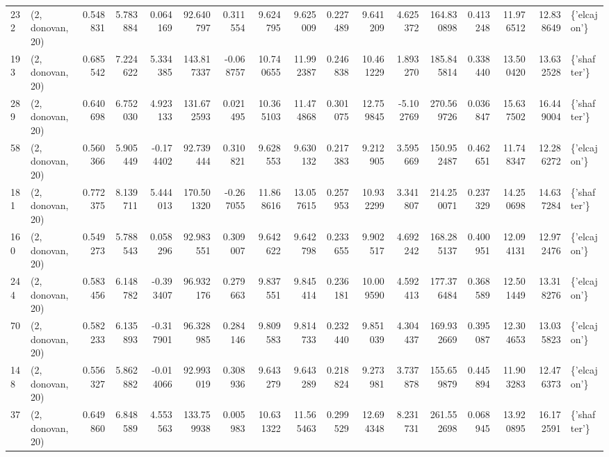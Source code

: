 \begin{tabular}{llrrrrrrrrrrrrrrl}
232 &  (2, donovan, 20) &   0.548831 &   5.783884 &   0.064169 &    92.640797 &   0.311554 &   9.624795 &   9.625009 &  0.227489 &   9.641209 &   4.625372 &   164.830898 &   0.413248 &  11.976512 &  12.838649 &  \{'elcajon'\} \\
193 &  (2, donovan, 20) &   0.685542 &   7.224622 &   5.334385 &   143.817337 &  -0.068757 &  10.740655 &  11.992387 &  0.246838 &  10.461229 &   1.893270 &   185.845814 &   0.338440 &  13.500420 &  13.632528 &  \{'shafter'\} \\
289 &  (2, donovan, 20) &   0.640698 &   6.752030 &   4.923133 &   131.672593 &   0.021495 &  10.365103 &  11.474868 &  0.301075 &  12.759845 &  -5.102769 &   270.569726 &   0.036847 &  15.637502 &  16.449004 &  \{'shafter'\} \\
58  &  (2, donovan, 20) &   0.560366 &   5.905449 &  -0.174402 &    92.739444 &   0.310821 &   9.628553 &   9.630132 &  0.217383 &   9.212905 &   3.595669 &   150.952487 &   0.462651 &  11.748347 &  12.286272 &  \{'elcajon'\} \\
181 &  (2, donovan, 20) &   0.772375 &   8.139711 &   5.444013 &   170.501320 &  -0.267055 &  11.868616 &  13.057615 &  0.257953 &  10.932299 &   3.341807 &   214.250071 &   0.237329 &  14.250698 &  14.637284 &  \{'shafter'\} \\
160 &  (2, donovan, 20) &   0.549273 &   5.788543 &   0.058296 &    92.983551 &   0.309007 &   9.642622 &   9.642798 &  0.233655 &   9.902517 &   4.692242 &   168.285137 &   0.400951 &  12.094131 &  12.972476 &  \{'elcajon'\} \\
244 &  (2, donovan, 20) &   0.583456 &   6.148782 &  -0.393407 &    96.932176 &   0.279663 &   9.837551 &   9.845414 &  0.236181 &  10.009590 &   4.592413 &   177.376484 &   0.368589 &  12.501449 &  13.318276 &  \{'elcajon'\} \\
70  &  (2, donovan, 20) &   0.582233 &   6.135893 &  -0.317901 &    96.328985 &   0.284146 &   9.809583 &   9.814733 &  0.232440 &   9.851039 &   4.304437 &   169.932669 &   0.395087 &  12.304653 &  13.035823 &  \{'elcajon'\} \\
148 &  (2, donovan, 20) &   0.556327 &   5.862882 &  -0.014066 &    92.993019 &   0.308936 &   9.643279 &   9.643289 &  0.218824 &   9.273981 &   3.737878 &   155.659879 &   0.445894 &  11.903283 &  12.476373 &  \{'elcajon'\} \\
37  &  (2, donovan, 20) &   0.649860 &   6.848589 &   4.553563 &   133.759938 &   0.005983 &  10.631322 &  11.565463 &  0.299529 &  12.694348 &   8.231731 &   261.552698 &   0.068945 &  13.920895 &  16.172591 &  \{'shafter'\} \\

\end{tabular}
